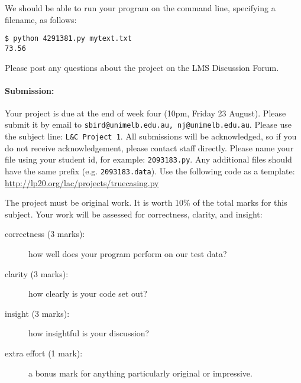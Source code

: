 \documentclass[a4paper,10pt]{article}
\begin{document}
We should be able to run your program on the command line, specifying a filename, as follows:

\begin{verbatim}
$ python 4291381.py mytext.txt
73.56
\end{verbatim}

Please post any questions about the project on the LMS Discussion Forum.

\paragraph{Submission:}
Your project is due at the end of week four (10pm, Friday 23 August). Please submit it by email to
\texttt{sbird@unimelb.edu.au, nj@unimelb.edu.au}. Please use the subject line: \texttt{L\&C Project 1}.
All submissions will be acknowledged, so if you do not receive acknowledgement, please contact staff directly.
Please name your file using your student id, for example: \texttt{2093183.py}. Any additional files should
have the same prefix (e.g. \texttt{2093183.data}). Use the following code as a
template: \url{http://lp20.org/lac/projects/truecasing.py}

The project must be original work.
It is worth 10\% of the total marks for this subject.
Your work will be assessed for correctness, clarity, and insight:

\begin{description}
\item[correctness (3 marks):] how well does your program perform on our test data?
\item[clarity (3 marks):] how clearly is your code set out?
\item[insight (3 marks):] how insightful is your discussion?
\item[extra effort (1 mark):] a bonus mark for anything particularly original or impressive.
\end{description}
\end{document}
